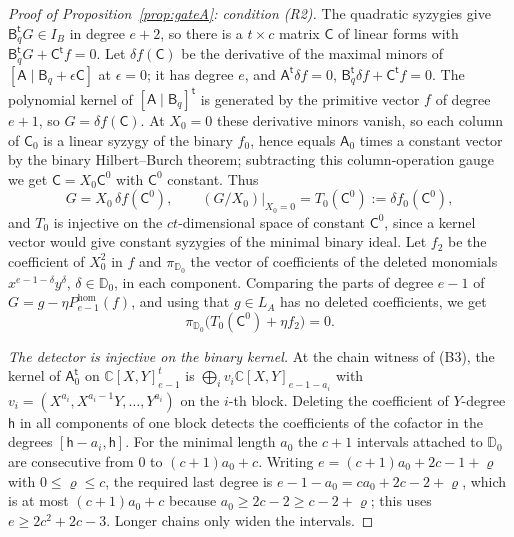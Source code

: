 \documentclass{amsart}
\theoremstyle{definition}
\theoremstyle{remark}
\numberwithin{equation}{section}
\newcommand{\CC}{\mathbb{C}}
\begin{document}
\begin{proof}[Proof of Proposition~\ref{prop:gateA}: condition (R2)]
The quadratic syzygies give $\mathsf B_q^{\mathsf t}G\in I_B$ in degree $e+2$, so there is
a $t\times c$ matrix $\mathsf C$ of linear forms with
$\mathsf B_q^{\mathsf t}G+\mathsf C^{\mathsf t}f=0$. Let $\delta f(\mathsf C)$ be the
derivative of the maximal minors of $[\mathsf A\mid\mathsf B_q+\epsilon\mathsf C]$ at
$\epsilon=0$; it has degree $e$, and $\mathsf A^{\mathsf t}\delta f=0$,
$\mathsf B_q^{\mathsf t}\delta f+\mathsf C^{\mathsf t}f=0$. The polynomial kernel of
$[\mathsf A\mid\mathsf B_q]^{\mathsf t}$ is generated by the primitive vector $f$ of
degree $e+1$, so $G=\delta f(\mathsf C)$. At $X_0=0$ these derivative minors vanish, so
each column of $\mathsf C_0$ is a linear syzygy of the binary $f_0$, hence equals
$\mathsf A_0$ times a constant vector by the binary Hilbert--Burch theorem; subtracting
this column-operation gauge we get $\mathsf C=X_0\mathsf C^0$ with $\mathsf C^0$ constant.
Thus
\begin{equation}\label{eq:GZ}
  G=X_0\,\delta f(\mathsf C^0),\qquad (G/X_0)|_{X_0=0}=T_0(\mathsf C^0):=\delta f_0(\mathsf C^0),
\end{equation}
and $T_0$ is injective on the $ct$-dimensional space of constant $\mathsf C^0$, since a
kernel vector would give constant syzygies of the minimal binary ideal. Let $f_2$ be the
coefficient of $X_0^2$ in $f$ and $\pi_{\mathbb D_0}$ the vector of coefficients of the
deleted monomials $x^{e-1-\delta}y^\delta$, $\delta\in\mathbb D_0$, in each component.
Comparing the parts of degree $e-1$ of $G=g-\eta P^{\mathrm{hom}}_{e-1}(f)$, and using that $g\in L_A$
has no deleted coefficients, we get
\begin{equation}\label{eq:detect}
  \pi_{\mathbb D_0}\bigl(T_0(\mathsf C^0)+\eta f_2\bigr)=0 .
\end{equation}

\emph{The detector is injective on the binary kernel.} At the chain witness of (B3),
the kernel of $\mathsf A_0^{\mathsf t}$ on $\CC[X,Y]_{e-1}^t$ is $\bigoplus_iv_i\CC[X,Y]_{e-1-a_i}$ with
$v_i=(X^{a_i},X^{a_i-1}Y,\dots,Y^{a_i})$ on the $i$-th block. Deleting the coefficient
of $Y$-degree $\mathsf h$ in all components of one block detects the coefficients of the
cofactor in the degrees $[\mathsf h-a_i,\mathsf h]$. For the minimal length $a_0$ the
$c+1$ intervals attached to $\mathbb D_0$ are consecutive from $0$ to $(c+1)a_0+c$.
Writing $e=(c+1)a_0+2c-1+\varrho$ with $0\le\varrho\le c$, the required last degree is
$e-1-a_0=ca_0+2c-2+\varrho$, which is at most $(c+1)a_0+c$ because $a_0\ge2c-2\ge
c-2+\varrho$; this uses $e\ge2c^2+2c-3$. Longer chains only widen the intervals.


\end{proof}
\end{document}

